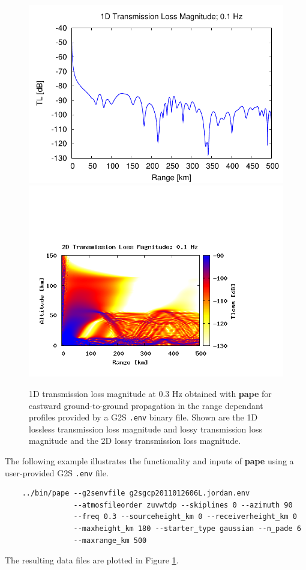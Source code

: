 \begin{figure}[h]
\begin{center}
\includegraphics[scale=0.60]{figs/pade_ex1_1d}
\includegraphics[scale=0.45,trim = 20 20 110 140,clip]{figs/pade_ex1_2d.png}
\end{center}
\caption{1D transmission loss magnitude at 0.3 Hz obtained with {\bf pape} for eastward ground-to-ground propagation in the range dependant profiles provided by a G2S {\tt .env} binary file. Shown are the 1D lossless transmission loss magnitude and lossy transmission loss magnitude and the 2D lossy transmission loss magnitude.}
\label{fig: pade ex1}
\end{figure}

The following example illustrates the functionality and inputs of {\bf pape} using a user-provided G2S {\tt .env} file. 
\begin{verbatim}
    ../bin/pape --g2senvfile g2sgcp2011012606L.jordan.env 
                --atmosfileorder zuvwtdp --skiplines 0 --azimuth 90 
                --freq 0.3 --sourceheight_km 0 --receiverheight_km 0 
                --maxheight_km 180 --starter_type gaussian --n_pade 6 
                --maxrange_km 500
\end{verbatim}
The resulting data files are plotted in Figure \ref{fig: pade ex1}. 

